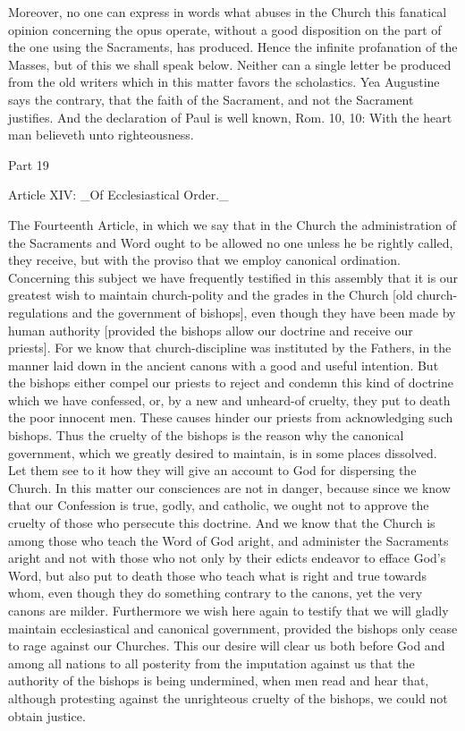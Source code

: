 Moreover, no one can express in words what abuses in the Church this
fanatical opinion concerning the opus operate, without a good
disposition on the part of the one using the Sacraments, has produced.
Hence the infinite profanation of the Masses, but of this we shall
speak below.  Neither can a single letter be produced from the old
writers which in this matter favors the scholastics.  Yea Augustine
says the contrary, that the faith of the Sacrament, and not the
Sacrament justifies.  And the declaration of Paul is well known, Rom.
10, 10: With the heart man believeth unto righteousness.




Part 19


Article XIV: _Of Ecclesiastical Order._

The Fourteenth Article, in which we say that in the Church the
administration of the Sacraments and Word ought to be allowed no one
unless he be rightly called, they receive, but with the proviso that
we employ canonical ordination.  Concerning this subject we have
frequently testified in this assembly that it is our greatest wish to
maintain church-polity and the grades in the Church [old
church-regulations and the government of bishops], even though they
have been made by human authority [provided the bishops allow our
doctrine and receive our priests].  For we know that
church-discipline was instituted by the Fathers, in the manner laid
down in the ancient canons with a good and useful intention.  But the
bishops either compel our priests to reject and condemn this kind of
doctrine which we have confessed, or, by a new and unheard-of cruelty,
they put to death the poor innocent men.  These causes hinder our
priests from acknowledging such bishops.  Thus the cruelty of the
bishops is the reason why the canonical government, which we greatly
desired to maintain, is in some places dissolved.  Let them see to it
how they will give an account to God for dispersing the Church.  In
this matter our consciences are not in danger, because since we know
that our Confession is true, godly, and catholic, we ought not to
approve the cruelty of those who persecute this doctrine.  And we
know that the Church is among those who teach the Word of God aright,
and administer the Sacraments aright and not with those who not only
by their edicts endeavor to efface God's Word, but also put to death
those who teach what is right and true towards whom, even though they
do something contrary to the canons, yet the very canons are milder.
Furthermore we wish here again to testify that we will gladly
maintain ecclesiastical and canonical government, provided the
bishops only cease to rage against our Churches.  This our desire
will clear us both before God and among all nations to all posterity
from the imputation against us that the authority of the bishops is
being undermined, when men read and hear that, although protesting
against the unrighteous cruelty of the bishops, we could not obtain
justice.




